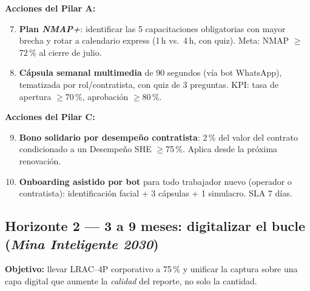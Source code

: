 \documentclass[12pt,a4paper]{article}
\begin{document}
\textbf{Acciones del Pilar A:}
\begin{enumerate}\setcounter{enumi}{6}
\item \textbf{Plan \emph{NMAP+}}: identificar las 5 capacitaciones obligatorias con mayor brecha y rotar a calendario express (1\,h vs.\ 4\,h, con quiz). Meta: NMAP $\geq$72\,\% al cierre de julio.
\item \textbf{Cápsula semanal multimedia} de 90 segundos (vía bot WhatsApp), tematizada por rol/contratista, con quiz de 3 preguntas. KPI: tasa de apertura $\geq$70\,\%, aprobación $\geq$80\,\%.
\end{enumerate}

\textbf{Acciones del Pilar C:}
\begin{enumerate}\setcounter{enumi}{8}
\item \textbf{Bono solidario por desempeño contratista}: 2\,\% del valor del contrato condicionado a un Desempeño SHE $\geq$75\,\%. Aplica desde la próxima renovación.
\item \textbf{Onboarding asistido por bot} para todo trabajador nuevo (operador o contratista): identificación facial + 3 cápsulas + 1 simulacro. SLA 7 días.
\end{enumerate}

\subsection{Horizonte 2 --- 3 a 9 meses: digitalizar el bucle (\emph{Mina Inteligente 2030})}

\begin{kbox}
\textbf{Objetivo:} llevar LRAC--4P corporativo a 75\,\% y unificar la captura sobre una capa digital que aumente la \emph{calidad} del reporte, no solo la cantidad.
\end{kbox}
\end{document}
